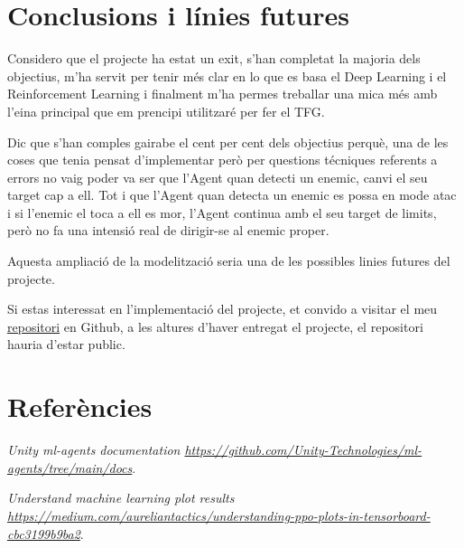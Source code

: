\documentclass{article}
\begin{document}
 
    \section{Conclusions i línies futures}
    
    Considero que el projecte ha estat un exit, s'han completat la majoria dels objectius, m'ha servit per tenir més clar en lo que es basa el Deep Learning i el Reinforcement Learning i finalment m'ha permes treballar una mica més amb l'eina principal que em prencipi utilitzaré per fer el TFG.
    
    Dic que s'han comples gairabe el cent per cent dels objectius perquè, una de les coses que tenia pensat d'implementar però per questions técniques referents a errors no vaig poder va ser que l'Agent quan detecti un enemic, canvi el seu target cap a ell. Tot i que l'Agent quan detecta un enemic es possa en mode atac i si l'enemic el toca a ell es mor, l'Agent continua amb el seu target de limits, però no fa una intensió real de dirigir-se al enemic proper.
    
    Aquesta ampliació de la modelització seria una de les possibles linies futures del projecte.
    
    Si estas interessat en l'implementació del projecte, et convido a visitar el meu \href{https://github.com/wilberquito/NPC}{repositori} en Github, a les altures d'haver entregat el projecte, el repositori hauria d'estar public.
    
    \section{Referències}
    
    \begin{thebibliography}{9}
    \emph{Unity ml-agents documentation \url{https://github.com/Unity-Technologies/ml-agents/tree/main/docs}}.
    
    \emph{Understand machine learning plot results
    \url{https://medium.com/aureliantactics/understanding-ppo-plots-in-tensorboard-cbc3199b9ba2}}.
    
    \end{thebibliography}
\end{document}

